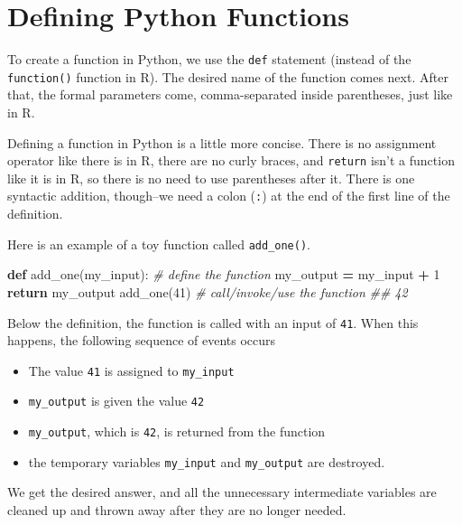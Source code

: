 \documentclass[12pt,krantz2]{krantz}
\makeatletter
\newenvironment{Shaded}{\begin{snugshade}}{\end{snugshade}}
\newcommand{\CommentTok}[1]{\textcolor[rgb]{0.37,0.37,0.37}{\textit{#1}}}
\newcommand{\ControlFlowTok}[1]{\textcolor[rgb]{0.27,0.27,0.27}{\textbf{#1}}}
\newcommand{\DecValTok}[1]{\textcolor[rgb]{0.06,0.06,0.06}{#1}}
\newcommand{\KeywordTok}[1]{\textcolor[rgb]{0.27,0.27,0.27}{\textbf{#1}}}
\newcommand{\NormalTok}[1]{#1}
\newcommand{\OperatorTok}[1]{\textcolor[rgb]{0.43,0.43,0.43}{\textbf{#1}}}
\providecommand{\tightlist}{%
  \setlength{\itemsep}{0pt}\setlength{\parskip}{0pt}}
\newenvironment{kframe}{%
\medskip{}
\setlength{\fboxsep}{.8em}
 \def\at@end@of@kframe{}%
 \ifinner\ifhmode%
  \def\at@end@of@kframe{\end{minipage}}%
  \begin{minipage}{\columnwidth}%
 \fi\fi%
 \def\FrameCommand##1{\hskip\@totalleftmargin \hskip-\fboxsep
 \colorbox{shadecolor}{##1}\hskip-\fboxsep
     \hskip-\linewidth \hskip-\@totalleftmargin \hskip\columnwidth}%
 \MakeFramed {\advance\hsize-\width
   \@totalleftmargin\z@ \linewidth\hsize
   \@setminipage}}%
 {\par\unskip\endMakeFramed%
 \at@end@of@kframe}
\renewenvironment{Shaded}{\begin{kframe}}{\end{kframe}}
\makeatother
\begin{document}
\hypertarget{defining-python-functions}{%
\section{Defining Python Functions}\label{defining-python-functions}}

To create a function in Python, we use the \texttt{def} statement (instead of the \texttt{function()} function in R). The desired name of the function comes next. After that, the formal parameters come, comma-separated inside parentheses, just like in R.

Defining a function in Python is a little more concise. There is no assignment operator like there is in R, there are no curly braces, and \texttt{return} isn't a function like it is in R, so there is no need to use parentheses after it. There is one syntactic addition, though--we need a colon (\texttt{:}) at the end of the first line of the definition.

Here is an example of a toy function called \texttt{add\_one()}.

\begin{Shaded}
\begin{Highlighting}[]
\KeywordTok{def}\NormalTok{ add_one(my_input):  }\CommentTok{# define the function}
\NormalTok{    my_output }\OperatorTok{=}\NormalTok{ my_input }\OperatorTok{+} \DecValTok{1}
    \ControlFlowTok{return}\NormalTok{ my_output}
\NormalTok{add_one(}\DecValTok{41}\NormalTok{) }\CommentTok{# call/invoke/use the function }
\CommentTok{## 42}
\end{Highlighting}
\end{Shaded}

Below the definition, the function is called with an input of \texttt{41}. When this happens, the following sequence of events occurs

\begin{itemize}
\tightlist
\item
  The value \texttt{41} is assigned to \texttt{my\_input}
\item
  \texttt{my\_output} is given the value \texttt{42}
\item
  \texttt{my\_output}, which is \texttt{42}, is returned from the function
\item
  the temporary variables \texttt{my\_input} and \texttt{my\_output} are destroyed.
\end{itemize}

We get the desired answer, and all the unnecessary intermediate variables are cleaned up and thrown away after they are no longer needed.
\end{document}
